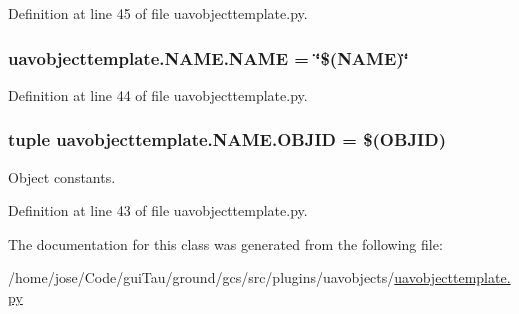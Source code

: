 Definition at line 45 of file uavobjecttemplate.\-py.

\hypertarget{classuavobjecttemplate_1_1_n_a_m_e_aa4152a2f11973340936522b0ee53b625}{
\subsubsection[{N\-A\-M\-E}]{ uavobjecttemplate.\-N\-A\-M\-E.\-N\-A\-M\-E = \char`\"{}\$(N\-A\-M\-E)\char`\"{}\hspace{0.3cm}{\ttfamily [static]}}}\label{classuavobjecttemplate_1_1_n_a_m_e_aa4152a2f11973340936522b0ee53b625}


Definition at line 44 of file uavobjecttemplate.\-py.

\hypertarget{classuavobjecttemplate_1_1_n_a_m_e_a82049c81486660578e43d32818270eb6}{
\subsubsection[{O\-B\-J\-I\-D}]{\setlength{\rightskip}{0pt plus 5cm}tuple uavobjecttemplate.\-N\-A\-M\-E.\-O\-B\-J\-I\-D = \$(O\-B\-J\-I\-D)\hspace{0.3cm}{\ttfamily [static]}}}\label{classuavobjecttemplate_1_1_n_a_m_e_a82049c81486660578e43d32818270eb6}


Object constants. 



Definition at line 43 of file uavobjecttemplate.\-py.



The documentation for this class was generated from the following file\-:\begin{DoxyCompactItemize}
\item 
/home/jose/\-Code/gui\-Tau/ground/gcs/src/plugins/uavobjects/\hyperlink{uavobjecttemplate_8py}{uavobjecttemplate.\-py}\end{DoxyCompactItemize}
